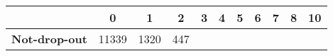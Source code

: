\documentclass[]{book}
\theoremstyle{definition}
\theoremstyle{definition}
\theoremstyle{remark}
\begin{document}
\begin{longtable}[]{@{}ccccccccccc@{}}
\toprule
\begin{minipage}[b]{0.19\columnwidth}\centering\strut
~\strut
\end{minipage} & \begin{minipage}[b]{0.06\columnwidth}\centering\strut
0\strut
\end{minipage} & \begin{minipage}[b]{0.05\columnwidth}\centering\strut
1\strut
\end{minipage} & \begin{minipage}[b]{0.04\columnwidth}\centering\strut
2\strut
\end{minipage} & \begin{minipage}[b]{0.04\columnwidth}\centering\strut
3\strut
\end{minipage} & \begin{minipage}[b]{0.04\columnwidth}\centering\strut
4\strut
\end{minipage} & \begin{minipage}[b]{0.04\columnwidth}\centering\strut
5\strut
\end{minipage} & \begin{minipage}[b]{0.04\columnwidth}\centering\strut
6\strut
\end{minipage} & \begin{minipage}[b]{0.04\columnwidth}\centering\strut
7\strut
\end{minipage} & \begin{minipage}[b]{0.04\columnwidth}\centering\strut
8\strut
\end{minipage} & \begin{minipage}[b]{0.04\columnwidth}\centering\strut
10\strut
\end{minipage}\tabularnewline
\midrule
\endhead
\begin{minipage}[t]{0.19\columnwidth}\centering\strut
\textbf{Not-drop-out}\strut
\end{minipage} & \begin{minipage}[t]{0.06\columnwidth}\centering\strut
11339\strut
\end{minipage} & \begin{minipage}[t]{0.05\columnwidth}\centering\strut
1320\strut
\end{minipage} & \begin{minipage}[t]{0.04\columnwidth}\centering\strut
447\strut
\end{minipage} & \begin{minipage}[t]{0.04\columnwidth}\centering\strut

\end{minipage}
\end{longtable}
\end{document}
